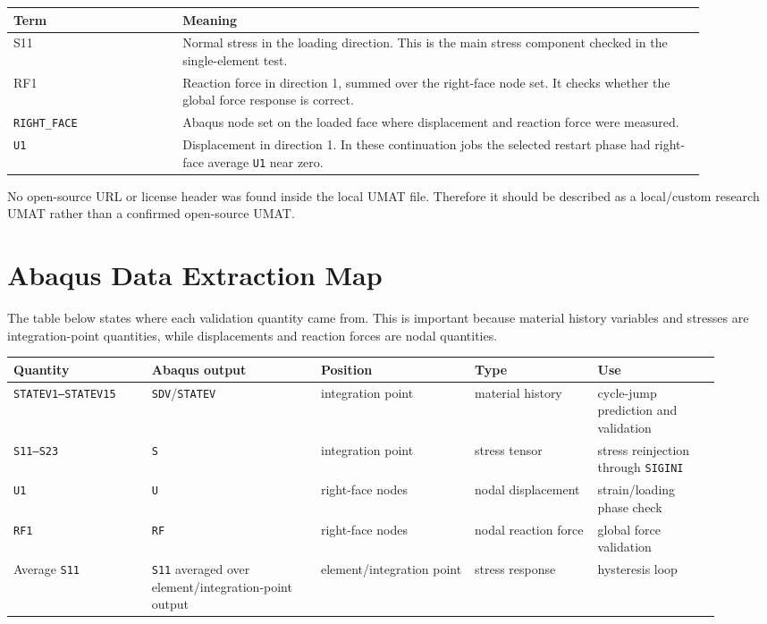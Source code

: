 \documentclass[11pt,a4paper]{article}
\begin{document}
\begin{center}
\begin{tabular}{p{0.22\linewidth}p{0.68\linewidth}}
\toprule
Term & Meaning \\
\midrule
S11 & Normal stress in the loading direction. This is the main stress component checked in the single-element test. \\
RF1 & Reaction force in direction 1, summed over the right-face node set. It checks whether the global force response is correct. \\
\texttt{RIGHT\_FACE} & Abaqus node set on the loaded face where displacement and reaction force were measured. \\
\texttt{U1} & Displacement in direction 1. In these continuation jobs the selected restart phase had right-face average \texttt{U1} near zero. \\
\bottomrule
\end{tabular}
\end{center}

No open-source URL or license header was found inside the local UMAT file. Therefore it should be described as a local/custom research UMAT rather than a confirmed open-source UMAT.

\section{Abaqus Data Extraction Map}

The table below states where each validation quantity came from. This is important because material history variables and stresses are integration-point quantities, while displacements and reaction forces are nodal quantities.

\begin{center}
\begin{tabular}{p{0.18\linewidth}p{0.22\linewidth}p{0.20\linewidth}p{0.16\linewidth}p{0.16\linewidth}}
\toprule
Quantity & Abaqus output & Position & Type & Use \\
\midrule
\texttt{STATEV1--STATEV15} & \texttt{SDV}/\texttt{STATEV} & integration point & material history & cycle-jump prediction and validation \\
\texttt{S11--S23} & \texttt{S} & integration point & stress tensor & stress reinjection through \texttt{SIGINI} \\
\texttt{U1} & \texttt{U} & right-face nodes & nodal displacement & strain/loading phase check \\
\texttt{RF1} & \texttt{RF} & right-face nodes & nodal reaction force & global force validation \\
Average \texttt{S11} & \texttt{S11} averaged over element/integration-point output & element/integration point & stress response & hysteresis loop \\
\bottomrule
\end{tabular}
\end{center}
\end{document}
